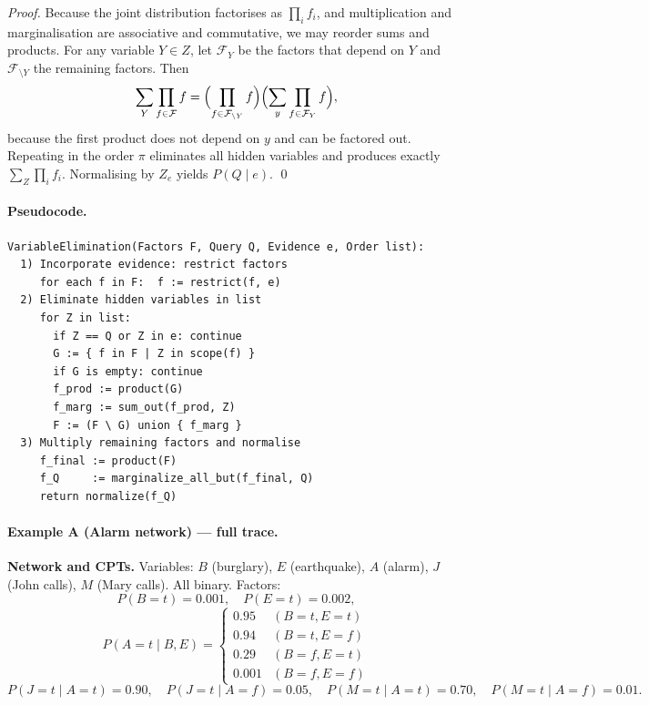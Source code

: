 \begin{proof}
Because the joint distribution factorises as $\prod_i f_i$, and multiplication
and marginalisation are associative and commutative, we may reorder sums and
products. For any variable $Y\in Z$, let $\mathcal{F}_Y$ be the factors that
depend on $Y$ and $\mathcal{F}_{\setminus Y}$ the remaining factors. Then
\[
\sum_Y \prod_{f\in\mathcal{F}} f
= \Bigl(\prod_{f\in\mathcal{F}_{\setminus Y}} f\Bigr)
  \Bigl(\sum_{y}\prod_{f\in\mathcal{F}_Y} f\Bigr),
\]
because the first product does not depend on $y$ and can be factored out.
Repeating in the order $\pi$ eliminates all hidden variables and produces
exactly $\sum_Z\prod_i f_i$. Normalising by $Z_e$ yields $P(Q\mid e)$. \qed
\end{proof}

\paragraph{Pseudocode.}
\vspace*{3mm}
\begin{algorithmbox}
\begin{verbatim}
VariableElimination(Factors F, Query Q, Evidence e, Order list):
  1) Incorporate evidence: restrict factors
     for each f in F:  f := restrict(f, e)
  2) Eliminate hidden variables in list
     for Z in list:
       if Z == Q or Z in e: continue
       G := { f in F | Z in scope(f) }
       if G is empty: continue
       f_prod := product(G)
       f_marg := sum_out(f_prod, Z)
       F := (F \ G) union { f_marg }
  3) Multiply remaining factors and normalise
     f_final := product(F)
     f_Q     := marginalize_all_but(f_final, Q)
     return normalize(f_Q)
\end{verbatim}
\end{algorithmbox}

\paragraph{Example A (Alarm network) --- full trace.}

\textbf{Network and CPTs.}
Variables: $B$ (burglary), $E$ (earthquake), $A$ (alarm), $J$ (John calls),
$M$ (Mary calls). All binary. Factors:
\[
P(B=t)=0.001,\quad P(E=t)=0.002,
\]
\[
P(A=t\mid B,E)=
\begin{cases}
0.95 & (B=t,E=t)\\0.94 & (B=t,E=f)\\0.29 & (B=f,E=t)\\0.001 & (B=f,E=f)
\end{cases}
\]
\[
P(J=t\mid A=t)=0.90,\quad P(J=t\mid A=f)=0.05,\quad
P(M=t\mid A=t)=0.70,\quad P(M=t\mid A=f)=0.01.
\]

